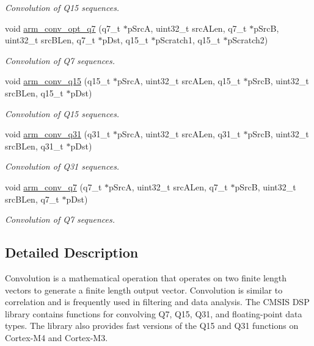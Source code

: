 \begin{DoxyCompactItemize}
\begin{DoxyCompactList}\small\item\em Convolution of Q15 sequences. \end{DoxyCompactList}\item 
void \hyperlink{group__Conv_ga4c7cf073e89d6d57cc4e711f078c3f68}{arm\+\_\+conv\+\_\+opt\+\_\+q7} (q7\+\_\+t $\ast$p\+SrcA, uint32\+\_\+t src\+A\+Len, q7\+\_\+t $\ast$p\+SrcB, uint32\+\_\+t src\+B\+Len, q7\+\_\+t $\ast$p\+Dst, q15\+\_\+t $\ast$p\+Scratch1, q15\+\_\+t $\ast$p\+Scratch2)
\begin{DoxyCompactList}\small\item\em Convolution of Q7 sequences. \end{DoxyCompactList}\item 
void \hyperlink{group__Conv_gaccd6a89b0ff7a94df64610598e6e6893}{arm\+\_\+conv\+\_\+q15} (q15\+\_\+t $\ast$p\+SrcA, uint32\+\_\+t src\+A\+Len, q15\+\_\+t $\ast$p\+SrcB, uint32\+\_\+t src\+B\+Len, q15\+\_\+t $\ast$p\+Dst)
\begin{DoxyCompactList}\small\item\em Convolution of Q15 sequences. \end{DoxyCompactList}\item 
void \hyperlink{group__Conv_ga946b58da734f1e4e78c91fcaab4b12b6}{arm\+\_\+conv\+\_\+q31} (q31\+\_\+t $\ast$p\+SrcA, uint32\+\_\+t src\+A\+Len, q31\+\_\+t $\ast$p\+SrcB, uint32\+\_\+t src\+B\+Len, q31\+\_\+t $\ast$p\+Dst)
\begin{DoxyCompactList}\small\item\em Convolution of Q31 sequences. \end{DoxyCompactList}\item 
void \hyperlink{group__Conv_gae2070cb792a167e78dbad8d06b97cdab}{arm\+\_\+conv\+\_\+q7} (q7\+\_\+t $\ast$p\+SrcA, uint32\+\_\+t src\+A\+Len, q7\+\_\+t $\ast$p\+SrcB, uint32\+\_\+t src\+B\+Len, q7\+\_\+t $\ast$p\+Dst)
\begin{DoxyCompactList}\small\item\em Convolution of Q7 sequences. \end{DoxyCompactList}\end{DoxyCompactItemize}


\subsection{Detailed Description}
Convolution is a mathematical operation that operates on two finite length vectors to generate a finite length output vector. Convolution is similar to correlation and is frequently used in filtering and data analysis. The C\+M\+S\+IS D\+SP library contains functions for convolving Q7, Q15, Q31, and floating-\/point data types. The library also provides fast versions of the Q15 and Q31 functions on Cortex-\/\+M4 and Cortex-\/\+M3.

